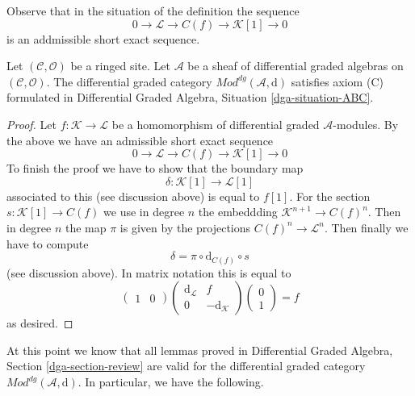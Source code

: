 \noindent
Observe that in the situation of the definition the sequence
$$
0 \to \mathcal{L} \to C(f) \to \mathcal{K}[1] \to 0
$$
is an addmissible short exact sequence.

\begin{lemma}
\label{lemma-axiom-C}
Let $(\mathcal{C}, \mathcal{O})$ be a ringed site.
Let $\mathcal{A}$ be a sheaf of differential graded algebras
on $(\mathcal{C}, \mathcal{O})$.
The differential graded category
$\textit{Mod}^{dg}(\mathcal{A}, \text{d})$
satisfies axiom (C) formulated in
Differential Graded Algebra, Situation \ref{dga-situation-ABC}.
\end{lemma}

\begin{proof}
Let $f : \mathcal{K} \to \mathcal{L}$
be a homomorphism of differential graded $\mathcal{A}$-modules.
By the above we have an admissible short exact sequence
$$
0 \to \mathcal{L} \to C(f) \to \mathcal{K}[1] \to 0
$$
To finish the proof we have to show that the boundary map
$$
\delta : \mathcal{K}[1] \to \mathcal{L}[1]
$$
associated to this (see discussion above) is equal to $f[1]$.
For the section $s : \mathcal{K}[1] \to C(f)$ we use in degree
$n$ the embeddding $\mathcal{K}^{n + 1} \to C(f)^n$. Then
in degree $n$ the map $\pi$ is given by the projections
$C(f)^n \to \mathcal{L}^n$. Then finally we have to compute
$$
\delta = \pi \circ \text{d}_{C(f)} \circ s
$$
(see discussion above). In matrix notation this is equal to
$$
\left(
\begin{matrix}
1 & 0
\end{matrix}
\right)
\left(
\begin{matrix}
\text{d}_\mathcal{L} & f \\
0 & -\text{d}_\mathcal{K}
\end{matrix}
\right)
\left(
\begin{matrix}
0 \\
1
\end{matrix}
\right) = f
$$
as desired.
\end{proof}

\noindent
At this point we know that all lemmas proved in
Differential Graded Algebra, Section \ref{dga-section-review}
are valid for the differential graded category
$\textit{Mod}^{dg}(\mathcal{A}, \text{d})$.
In particular, we have the following.

